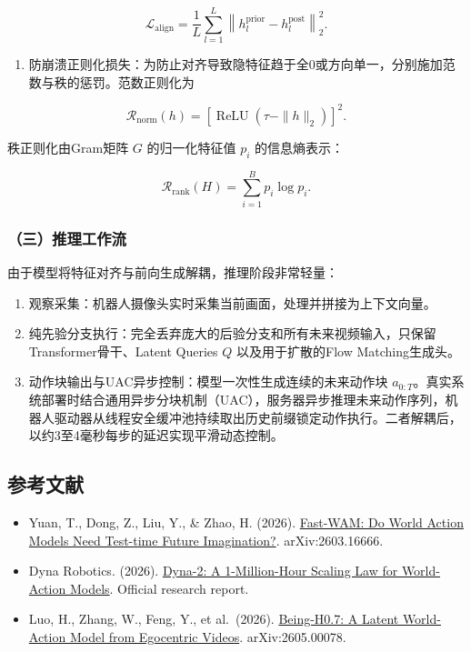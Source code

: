 \[
\mathcal{L}_{\mathrm{align}}=\frac{1}{L}\sum_{l=1}^{L}\left\|h_l^{\mathrm{prior}}-h_l^{\mathrm{post}}\right\|_2^2.
\]

\begin{enumerate}
\def\labelenumi{\arabic{enumi}.}
\setcounter{enumi}{2}
\tightlist
\item
  防崩溃正则化损失：为防止对齐导致隐特征趋于全0或方向单一，分别施加范数与秩的惩罚。范数正则化为
\end{enumerate}

\[
\mathcal{R}_{\mathrm{norm}}(h)=\left[\operatorname{ReLU}\!\left(\tau-\|h\|_2\right)\right]^2.
\]

秩正则化由Gram矩阵 \(G\) 的归一化特征值 \(p_i\) 的信息熵表示：

\[
\mathcal{R}_{\mathrm{rank}}(H)=\sum_{i=1}^{B}p_i\log p_i.
\]

\hypertarget{ux4e09ux63a8ux7406ux5de5ux4f5cux6d41}{%
\subsubsection{（三）推理工作流}\label{ux4e09ux63a8ux7406ux5de5ux4f5cux6d41}}

由于模型将特征对齐与前向生成解耦，推理阶段非常轻量：

\begin{enumerate}
\def\labelenumi{\arabic{enumi}.}
\tightlist
\item
  观察采集：机器人摄像头实时采集当前画面，处理并拼接为上下文向量。
\item
  纯先验分支执行：完全丢弃庞大的后验分支和所有未来视频输入，只保留Transformer骨干、Latent Queries \(Q\) 以及用于扩散的Flow Matching生成头。
\item
  动作块输出与UAC异步控制：模型一次性生成连续的未来动作块 \(a_{0:T}\)。真实系统部署时结合通用异步分块机制（UAC），服务器异步推理未来动作序列，机器人驱动器从线程安全缓冲池持续取出历史前缀锁定动作执行。二者解耦后，以约3至4毫秒每步的延迟实现平滑动态控制。
\end{enumerate}

\hypertarget{ux53c2ux8003ux6587ux732e-160}{%
\subsection{参考文献}\label{ux53c2ux8003ux6587ux732e-160}}

\vspace{0.25em}
\begin{itemize}
\tightlist
\item
  Yuan, T., Dong, Z., Liu, Y., \& Zhao, H. (2026). \href{https://arxiv.org/abs/2603.16666}{Fast-WAM: Do World Action Models Need Test-time Future Imagination?}. arXiv:2603.16666.
\item
  Dyna Robotics. (2026). \href{https://www.dyna.co/dyna-2}{Dyna-2: A 1-Million-Hour Scaling Law for World-Action Models}. Official research report.
\item
  Luo, H., Zhang, W., Feng, Y., et al.~(2026). \href{https://arxiv.org/abs/2605.00078}{Being-H0.7: A Latent World-Action Model from Egocentric Videos}. arXiv:2605.00078.
\end{itemize}

